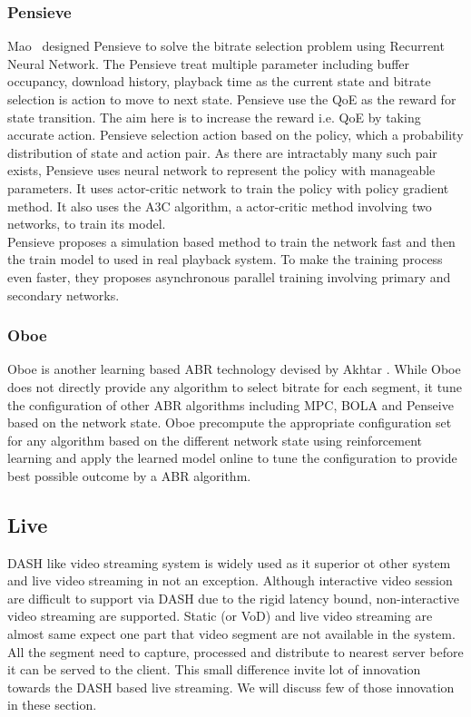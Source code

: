 \subsubsection{Pensieve}
Mao \etal\ designed Pensieve\cite{10.1145/3098822.3098843} to solve the bitrate selection problem using Recurrent Neural Network. The Pensieve treat multiple parameter including buffer occupancy, download history, playback time as the current state and bitrate selection is action to move to next state. Pensieve use the QoE as the reward for state transition. The aim here is to increase the reward i.e. QoE by taking accurate action. Pensieve selection action based on the policy, which a probability distribution of state and action pair. As there are intractably many such pair exists, Pensieve uses neural network to represent the policy with manageable parameters. It uses actor-critic network to train the policy with policy gradient method\cite{sutton1999policy}. It also uses the A3C\cite{10.5555/3045390.3045594} algorithm, a actor-critic method involving two networks, to train its model.\\
Pensieve proposes a simulation based method to train the network fast and then the train model to used in real playback system. To make the training process even faster, they proposes asynchronous parallel training involving primary and secondary networks.

\subsubsection{Oboe}
Oboe\cite{10.1145/3230543.3230558} is another learning based ABR technology devised by Akhtar \etal. While Oboe does not directly provide any algorithm to select bitrate for each segment, it tune the configuration of other ABR algorithms including MPC\cite{}, BOLA\cite{} and Penseive\cite{} based on the network state. Oboe precompute the appropriate configuration set for any algorithm based on the different network state using reinforcement learning and apply the learned model online to tune the configuration to provide best possible outcome by a ABR algorithm.

\subsection{Live}
DASH like video streaming system is widely used as it superior ot other system and live video streaming in not an exception. Although interactive video session are difficult to support via DASH due to the rigid latency bound, non-interactive video streaming are supported. Static (or VoD) and live video streaming are almost same expect one part that video segment are not available in the system. All the segment need to capture, processed and distribute to nearest server before it can be served to the client. This small difference invite lot of innovation towards the DASH based live streaming. We will discuss few of those innovation in these section.


